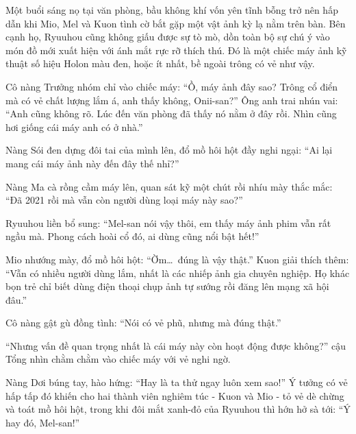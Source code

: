 \documentclass[../main.tex]{subfiles}
\begin{document}

Một buổi sáng nọ tại văn phòng, bầu không khí vốn yên tĩnh bỗng trở nên hấp dẫn khi Mio, Mel và Kuon tình cờ bắt gặp một vật ảnh kỳ lạ nằm trên bàn. Bên cạnh họ, Ryuuhou cũng không giấu được sự tò mò, dồn toàn bộ sự chú ý vào món đồ mới xuất hiện với ánh mắt rực rỡ thích thú. Đó là một chiếc máy ảnh kỹ thuật số hiệu Holon màu đen, hoặc ít nhất, bề ngoài trông có vẻ như vậy.

Cô nàng Trưởng nhóm chỉ vào chiếc máy: ``Ồ, máy ảnh đây sao? Trông cổ điển mà có vẻ chất lượng lắm á, anh thấy không, Onii-san?'' Ông anh trai nhún vai: ``Anh cũng không rõ. Lúc đến văn phòng đã thấy nó nằm ở đây rồi. Nhìn cũng hơi giống cái máy anh có ở nhà.''

Nàng Sói đen dựng đôi tai của mình lên, đổ mồ hôi hột đầy nghi ngại: ``Ai lại mang cái máy ảnh này đến đây thế nhỉ?''

Nàng Ma cà rồng cầm máy lên, quan sát kỹ một chút rồi nhíu mày thắc mắc: ``Đã 2021 rồi mà vẫn còn người dùng loại máy này sao?''


Ryuuhou liền bổ sung: ``Mel-san nói vậy thôi, em thấy máy ảnh phim vẫn rất ngầu mà. Phong cách hoài cổ đó, ai dùng cũng nổi bật hết!''

Mio nhướng mày, đổ mồ hôi hột: ``Ờm\dots\ đúng là vậy thật.'' Kuon giải thích thêm: ``Vẫn có nhiều người dùng lắm, nhất là các nhiếp ảnh gia chuyên nghiệp. Họ khác bọn trẻ chỉ biết dùng điện thoại chụp ảnh tự sướng rồi đăng lên mạng xã hội đâu.''

Cô nàng gật gù đồng tình: ``Nói có vẻ phũ, nhưng mà đúng thật.''

``Nhưng vấn đề quan trọng nhất là cái máy này còn hoạt động được không?'' cậu Tổng nhìn chằm chằm vào chiếc máy với vẻ nghi ngờ.

Nàng Dơi búng tay, hào hứng: ``Hay là ta thử ngay luôn xem sao!'' Ý tưởng có vẻ hấp tấp đó khiến cho hai thành viên nghiêm túc - Kuon và Mio - tỏ vẻ dè chừng và toát mồ hôi hột, trong khi đôi mắt xanh-đỏ của Ryuuhou thì hớn hở sà tới: ``Ý hay đó, Mel-san!''
\end{document}
